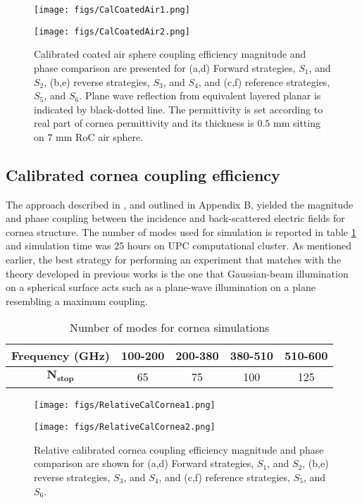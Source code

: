 \documentclass{osa-article}
\begin{document}
\begin{figure}[t]
\centering
\texttt{[image: figs/CalCoatedAir1.png]}
\vspace*{-6 mm}

\texttt{[image: figs/CalCoatedAir2.png]}
\caption{Calibrated coated air sphere coupling efficiency magnitude and phase comparison are presented for (a,d) Forward strategies, $S_1$, and $S_2$, (b,e) reverse strategies, $S_3$, and $S_4$, and (c,f) reference strategies, $S_5$, and $S_6$. Plane wave reflection from equivalent layered planar is indicated by black-dotted line. The permittivity is set according to real part of cornea permittivity and its thickness is $0.5$ mm sitting on $7$ mm RoC air sphere.}\label{air}
\end{figure}


\subsection{Calibrated cornea coupling efficiency}

The approach described in \cite{eucap}, and outlined in Appendix B, yielded the magnitude and phase coupling between the incidence and back-scattered electric fields for cornea structure. The number of modes used for simulation is reported in table \ref{t3} and simulation time was 25 hours on UPC computational cluster. As mentioned earlier, the best strategy for performing an experiment that matches with the theory developed in previous works \cite{quasi} is the one that Gaussian-beam illumination on a spherical surface acts such as a plane-wave illumination on a plane resembling a maximum coupling. 
\begin{table}[ht]
\centering
\caption{Number of modes for cornea simulations}\label{t3}
\begin{tabular}{ c | c  c  c  c }
\hline
\textbf{Frequency (GHz)} & 100-200 & 200-380 & 380-510 & 510-600 \\ 
\hline
$\mathbf{N_{stop}}$ & 65 & 75 & 100 & 125 \\ [0.5ex] 
\hline
\end{tabular}
\end{table}


\begin{figure}[ht]
\centering
\texttt{[image: figs/RelativeCalCornea1.png]}
\vspace*{-6 mm}

\texttt{[image: figs/RelativeCalCornea2.png]}
\caption{Relative calibrated cornea coupling efficiency magnitude and phase comparison are shown for (a,d) Forward strategies, $S_1$, and $S_2$, (b,e) reverse strategies, $S_3$, and $S_4$, and (c,f) reference strategies, $S_5$, and $S_6$.}\label{cornea}
\end{figure}
 
\end{document}
